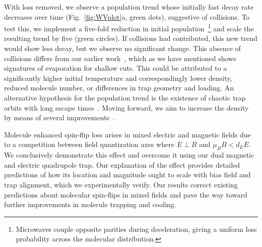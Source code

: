 \documentclass[%
 reprint,
 amsmath,amssymb,
 aps,
prl,
]{revtex4-1}
\newcommand{\red}[1]{{\color{black} #1}}
\newcommand{\epb}{{$E\!\perp\!B$}}
\newcommand{\cmnt}[1]{\ignorespaces}
\begin{document}
With loss removed, we observe a population trend whose initially fast decay rate decreases over time (Fig.~\ref{fig:WVplot}a, green dots), suggestive of collisions. To test this, we implement a five-fold reduction in initial population~\footnote{Microwaves couple opposite parities during deceleration, giving a uniform loss probability across the molecular distribution.} and scale the resulting trend by five (green circles). If collisions had contributed, this new trend would show less decay, but we observe no significant change. This absence of collisions differs from our earlier work~\cite{Stuhl2012evap}, which as we have mentioned shows signatures of evaporation for shallow cuts. This could be attributed to a significantly higher initial temperature and correspondingly lower density, reduced molecule number, or differences in trap geometry and loading. 
\red{An alternative hypothesis for the population trend is the existence of chaotic trap orbits with long escape times~\cite{Gonzalez-Ferez2014}.} 
\cmnt{It is also possible that the spin-flip loss is playing a role even for the light evaporation cuts, although it is unclear how this could masquerade as a normalized low field density enhancement.} 
Moving forward, we aim to increase the density by means of several improvements~\cite{Even2015,Segev2017}.


Molecule enhanced spin-flip loss arises in mixed electric and magnetic fields due to a competition between field quantization axes where \epb{} and $\mu_BB<d_EE$. We conclusively demonstrate this effect and overcome it using our dual magnetic and electric quadrupole trap. Our explanation of the effect provides detailed predictions of how its location and magnitude ought to scale with bias field and trap alignment, which we experimentally verify. Our results correct existing predictions about molecular spin-flips in mixed fields and pave the way toward further improvements in molecule trapping and cooling.
\end{document}
